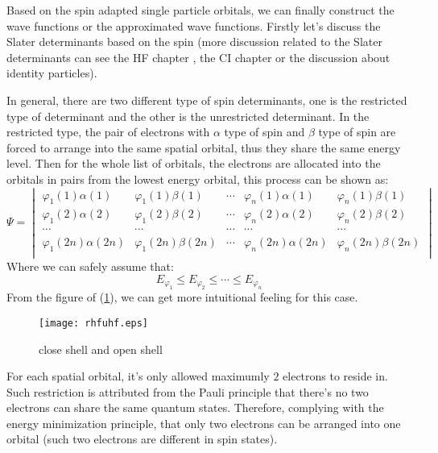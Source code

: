Based on the spin adapted single particle orbitals, we can finally
construct the wave functions or the approximated wave functions.
Firstly let's discuss the Slater determinants based on the spin
(more discussion related to the Slater determinants can see the HF
chapter , the CI chapter or the discussion about identity
particles).

In general, there are two different type of spin determinants, one
is the restricted type of determinant and the other is the
unrestricted determinant. In the restricted type, the pair of
electrons with $\alpha$ type of spin and $\beta$ type of spin are
forced to arrange into the same spatial orbital, thus they share the
same energy level. Then for the whole list of orbitals, the
electrons are allocated into the orbitals in pairs from the lowest
energy orbital, this process can be shown as:
\begin{equation}\label{}
\Psi =
 \begin{vmatrix}
   \varphi_{1}(1)\alpha(1) &  \varphi_{1}(1)\beta(1) &  \cdots  
   & \varphi_{n}(1)\alpha(1) & \varphi_{n}(1)\beta(1) \\
   \varphi_{1}(2)\alpha(2) &  \varphi_{1}(2)\beta(2) &  \cdots  
   & \varphi_{n}(2)\alpha(2) & \varphi_{n}(2)\beta(2) \\
   \cdots                 & \cdots & \cdots    & \cdots   & \cdots    \\
    \varphi_{1}(2n)\alpha(2n) &  \varphi_{1}(2n)\beta(2n) &  \cdots  
   & \varphi_{n}(2n)\alpha(2n) & \varphi_{n}(2n)\beta(2n) \\
 \end{vmatrix}
\end{equation}
Where we can safely assume that:
\begin{equation}\label{}
E_{\varphi_{1}} \leq E_{\varphi_{2}} \leq \cdots \leq
E_{\varphi_{n}}
\end{equation}
From the figure of (\ref{SIC1}), we can get more intuitional feeling
for this case.
\begin{figure}
\begin{center}
\texttt{[image: rhfuhf.eps]}
\caption{close shell and open shell} \label{SIC1}
\end{center}
\end{figure}

For each spatial orbital, it's only allowed maximumly $2$ electrons to reside
in. Such restriction is attributed from the Pauli principle that
there's no two electrons can share the same quantum states.
Therefore, complying with the energy minimization principle, that only
two electrons can be arranged into one orbital (such two electrons are
different in spin states).

